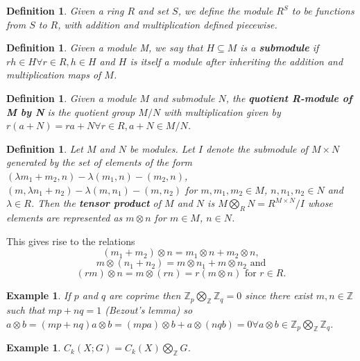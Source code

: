 \documentclass{article}
\newtheorem{definition}[theorem]{Definition}
\newtheorem{example}[theorem]{Example}
\begin{document}
\begin{definition}
Given a ring $R$ and set $S$, we define the module $R^S$ to be functions from $S$ to $R$, with addition and multiplication defined piecewise.
\end{definition}


\begin{definition}
Given a module M, we say that $H\subseteq M$ is a \textbf{submodule} if $rh\in H\forall r\in R,h\in H$ and $H$ is itself a module after inheriting the addition and multiplication maps of $M$.
\end{definition}

\begin{definition}
Given a module $M$ and submodule $N$, the \textbf{quotient R-module of M by N} is the quotient group $M/N$ with multiplication given by $r(a+N)=ra+N\forall r\in R,a+N\in M/N$.
\end{definition}

\begin{definition}
Let $M$ and $N$ be modules. Let $I$ denote the submodule of $M\times N$ generated by the set of elements of the form $(\lambda m_1+m_2,n)-\lambda(m_1,n)-(m_2,n)$, $(m,\lambda n_1+n_2)-\lambda(m,n_1)-(m,n_2)$ for $m,m_1,m_2\in M$, $n,n_1,n_2\in N$ and $\lambda\in R$. Then the \textbf{tensor product} of $M$ and $N$ is $M\bigotimes_R N=R^{M\times N}/I$ whose elements are represented as $m\otimes n$ for $m\in M$, $n\in N$.
\end{definition}

\noindent This gives rise to the relations \[(m_1+m_2)\otimes n=m_1\otimes n+m_2\otimes n,\]\[m\otimes(n_1+n_2)=m\otimes n_1+m\otimes n_2\text{ and}\] \[(rm)\otimes n=m\otimes (rn)=r(m\otimes n)\text{ for }r\in R.\]

\begin{example}
If $p$ and $q$ are coprime then $\mathbb{Z}_p\bigotimes_\mathbb{Z}\mathbb{Z}_q=0$ since there exist $m,n\in\mathbb{Z}$ such that $mp+nq=1$ (Bezout's lemma) so $a\otimes b=(mp+nq)a\otimes b=(mpa)\otimes b + a\otimes(nqb)=0\forall a\otimes b\in\mathbb{Z}_p\bigotimes_\mathbb{Z}\mathbb{Z}_q$.
\end{example}
\begin{example}
$C_k(X;G)=C_k(X)\bigotimes_\mathbb{Z}G$.
\end{example}
\end{document}
